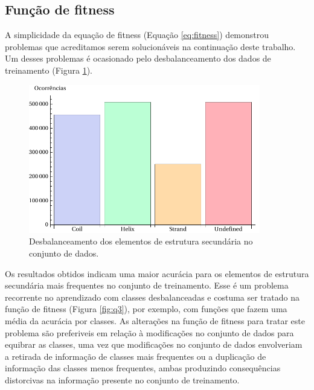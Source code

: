 

\subsection{Função de fitness}

A simplicidade da equação de fitness (Equação \ref{eq:fitness}) demonstrou problemas que acreditamos serem solucionáveis na continuação deste trabalho. Um desses problemas é ocasionado pelo desbalanceamento dos dados de treinamento (Figura \ref{fig:occ_ss}). 

\begin{figure}
  \centering
  \includegraphics[width=0.9\textwidth]{figures/occ_ss.pdf}
  \caption{Desbalanceamento dos elementos de estrutura secundária no conjunto de dados.}
        \label{fig:occ_ss}
\end{figure}

Os resultados obtidos indicam uma maior acurácia para os elementos de estrutura secundária mais frequentes no conjunto de treinamento. Esse é um problema recorrente no aprendizado com classes desbalanceadas e costuma ser tratado na função de fitness (Figura \ref{fig:q3}), por exemplo, com funções que fazem uma média da acurácia por classes. As alterações na função de fitness para tratar este problema são preferiveis em relação à modificações no conjunto de dados para equibrar as classes, uma vez que modificações no conjunto de dados envolveriam a retirada de informação de classes mais frequentes ou a duplicação de informação das classes menos frequentes, ambas produzindo consequências distorcivas na informação presente no conjunto de treinamento.


